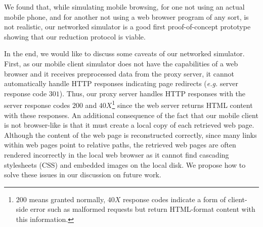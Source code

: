 We found that, while simulating mobile browsing, for one not using an actual mobile phone, and for 
another not using a web browser program of any sort, is not realistic, our networked simulator is a 
good first proof-of-concept prototype showing that our reduction protocol is viable.

In the end, we would like to discuss some caveats of our networked simulator. First, as our mobile 
client simulator does not have the capabilities of a web browser and it receives preprocessed data 
from the proxy server, it cannot automatically handle HTTP responses indicating page redirects (\textit{e.g.} 
server response code $301$). Thus, our proxy server handles HTTP responses with the 
server response codes $200$ and $40X$\footnote{$200$ means granted normally, $40X$ response codes 
indicate a form of client-side error such as malformed requests but return HTML-format content with 
this information.} since the web server returns HTML content with these responses. An additional 
consequence of the fact that our mobile client is not browser-like is that it must create a local copy 
of each retrieved web page. Although the content of the web page is reconstructed correctly, since 
many links within web pages point to relative paths, the retrieved web pages are often rendered 
incorrectly in the local web browser as it cannot find cascading stylesheets (CSS) and embedded images 
on the local disk. We propose how to solve these issues in our discussion on future work.